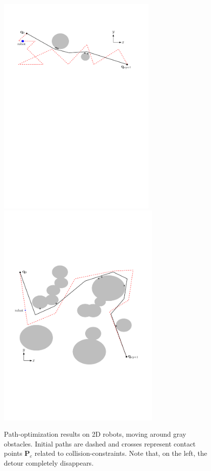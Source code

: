 \documentclass{tADR2e}
\newcommand\po{\mathbf{P}}
\begin{document}
\begin{figure}
	\centering
	\includegraphics[width=7.8cm]{contact_points6.pdf}
	\includegraphics[width=8cm]{contact_points2potential.pdf}
	\caption{Path-optimization results on 2D robots, moving around 
	gray obstacles. Initial paths are dashed and crosses represent contact points 
	$\po_c$ related to collision-constraints. Note that, on the left, the detour 
	completely disappears.}
	\label{2D_long}
\end{figure}
\end{document}
